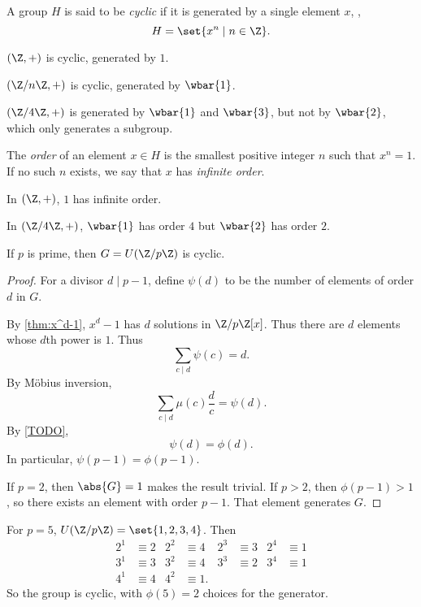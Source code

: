 \begin{definition} \label{def:group:cyclic}
    A group $H$ is said to be \emph{cyclic}
    if it is generated by a single element $x$, \ie, \[
        H = \set{x^n \mid n \in \Z}.
    \]
\end{definition}
\begin{examples}
    \item $(\Z, +)$ is cyclic, generated by $1$.
    \item $(\Z/n\Z, +)$ is cyclic, generated by $\wbar{1}$.
    \item $(\Z/4\Z, +)$ is generated by $\wbar{1}$ and $\wbar{3}$,
    but not by $\wbar{2}$, which only generates a subgroup.
\end{examples}

\begin{definition*} \label{def:group:element-order}
    The \emph{order} of an element $x\in H$ is the smallest
    positive integer $n$ such that $x^n = 1$.
    If no such $n$ exists, we say that $x$ has \emph{infinite order}.
\end{definition*}
\begin{examples}
    \item In $(\Z, +)$, $1$ has infinite order.
    \item In $(\Z/4\Z, +)$, $\wbar{1}$ has order $4$
    but $\wbar{2}$ has order $2$.
\end{examples}

\begin{theorem*}[Gauss] \label{thm:group:gauss}
    If $p$ is prime, then $G = U(\Z/p\Z)$ is cyclic.
\end{theorem*}
\begin{proof}
    For a divisor $d \mid p - 1$, define $\psi(d)$
    to be the number of elements of order $d$ in $G$.

    By \cref{thm:x^d-1}, $x^d - 1$ has $d$ solutions in $\Z/p\Z[x]$.
    Thus there are $d$ elements whose $d$th power is $1$.
    Thus \[
        \sum_{c \mid d} \psi(c) = d.
    \] By M\"obius inversion, \[
        \sum_{c \mid d} \mu(c) \frac{d}{c} = \psi(d).
    \] By \cref{TODO}, \[
        \psi(d) = \phi(d).
    \] In particular, $\psi(p - 1) = \phi(p - 1)$.

    If $p = 2$, then $\abs{G} = 1$ makes the result trivial.
    If $p > 2$, then $\phi(p - 1) > 1$, so there exists an element with
    order $p - 1$.
    That element generates $G$.
\end{proof}
\begin{example}
    For $p = 5$, $U(\Z/p\Z) = \set{1, 2, 3, 4}$.
    Then \begin{align*}
        2^1 &\equiv 2 & 2^2 &\equiv 4 & 2^3 &\equiv 3 & 2^4 &\equiv 1 \\
        3^1 &\equiv 3 & 3^2 &\equiv 4 & 3^3 &\equiv 2 & 3^4 &\equiv 1 \\
        4^1 &\equiv 4 & 4^2 &\equiv 1.
    \end{align*} So the group is cyclic, with $\phi(5) = 2$ choices for
    the generator.
\end{example}
